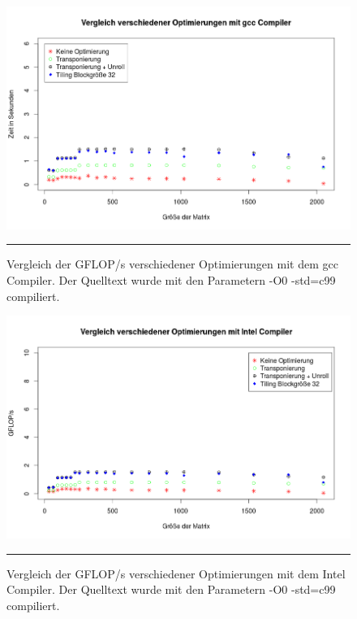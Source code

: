 \begin{figure}[h]
\includegraphics[scale = 0.45]{Bilder/GggcO0.png}
\caption{Vergleich der GFLOP/s verschiedener Optimierungen mit dem gcc Compiler. Der Quelltext wurde mit den Parametern -O0 -std=c99 compiliert.}
\noindent\rule{14cm}{0.4pt}
\label{Ggcc0}
\end{figure}

\begin{figure}[h]
\includegraphics[scale = 0.45]{Bilder/GiccO0.png}
\caption{Vergleich der GFLOP/s verschiedener Optimierungen mit dem Intel Compiler. Der Quelltext wurde mit den Parametern -O0 -std=c99 compiliert.}
\noindent\rule{14cm}{0.4pt}
\label{Gicc0}
\end{figure}